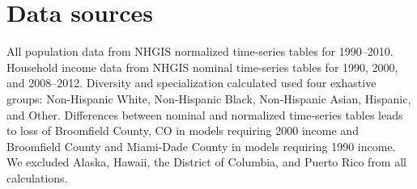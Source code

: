 \documentclass[12pt]{article}
\begin{document}
\section*{Data sources}

All population data from NHGIS normalized time-series tables for 1990--2010. Household income data from NHGIS nominal time-series tables for 1990, 2000, and 2008--2012. Diversity and specialization calculated used four exhastive groups: Non-Hispanic White, Non-Hispanic Black, Non-Hispanic Asian, Hispanic, and Other. Differences between nominal and normalized time-series tables leads to loss of Broomfield County, CO in models requiring 2000 income and Broomfield County and Miami-Dade County in models requiring 1990 income. We excluded Alaska, Hawaii, the District of Columbia, and Puerto Rico from all calculations.








\end{document}
